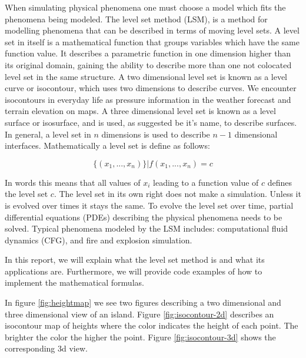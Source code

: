 When simulating physical phenomena one must choose a model which fits
the phenomena being modeled. The level set method (LSM), is a method
for modelling phenomena that can be described in terms of moving level
sets.
%
A level set in itself is a mathematical function that groups
variables which have the same function value. It describes a
parametric function in one dimension higher than its original domain,
gaining the ability to describe more than one not colocated level set
in the same structure.
%
A two dimensional level set is known as a level curve or isocontour,
which uses two dimensions to describe curves. We encounter isocontours
in everyday life as pressure information in the weather forecast and
terrain elevation on maps.
%
A three dimensional level set is
known as a level surface or isosurface, and is used, as suggested be
it's name, to describe surfaces. In general, a level set in $n$
dimensions is used to describe $n-1$ dimensional
interfaces. Mathematically a level set is define as follows:

\begin{equation}
\{ (x_1,...,x_n) \} | f(x_1,...,x_n) = c
\end{equation}

In words this means that all values of $x_i$ leading to a function
value of $c$ defines the level set $c$.
%
The level set in its own right does not make a simulation. Unless it
is evolved over times it stays the same. To evolve the level set over
time, partial differential equations (PDEs) describing the physical
phenomena needs to be solved.
%
Typical phenomena modeled by the LSM includes: computational fluid
dynamics (CFG), and fire and explosion simulation. 

In this report, we will explain what the level set method is and what
its applications are. Furthermore, we will provide code examples of
how to implement the mathematical formulas.

In figure \vref{fig:heightmap} we see two figures describing a two dimensional and
three dimensional view of an island. Figure \vref{fig:isocontour-2d} describes an
isocontour map of heights where the color indicates the height of each
point. The brighter the color the higher the point. Figure
\vref{fig:isocontour-3d} shows the corresponding 3d view.

